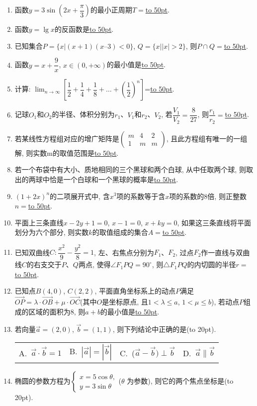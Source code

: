 \documentclass[10pt,a4paper]{article}
\newcommand{\blank}[1]{\underline{\hbox to #1pt{}}}
\newcommand{\bracket}[1]{(\hbox to #1pt{})}
\newcommand{\fourch}[4]{\par\begin{tabular}{p{.23\textwidth}p{.23\textwidth}p{.23\textwidth}p{.23\textwidth}}
A.~#1 &B.~#2& C.~#3& D.~#4
\end{tabular}}
\begin{document}
\begin{enumerate}[1.]
\item 函数$y=3\sin(2x+\dfrac{\pi}3)$的最小正周期$T=$\blank{50}.
\item 函数$y=\lg x$的反函数是\blank{50}.
\item 已知集合$P=\{x|(x+1)(x–3)<0\}$, $Q=\{x||x|>2\}$, 则$P\cap Q=$\blank{50}.
\item 函数$y=x+\dfrac 9x$, $x\in (0,+\infty)$的最小值是\blank{50}.
\item 计算: $\displaystyle\lim_{n\to \infty}[\dfrac 12+\dfrac 14+\dfrac 18+\ldots +(\dfrac 12)^n]$=\blank{50}.
\item 记球$O_1$和$O_2$的半径、体积分别为$r_1$、$V_1$和$r_2$、$V_2$, 若$\dfrac{V_1}{V_2}=\dfrac 8{27}$, 则$\dfrac{r_1}{r_2}=$\blank{50}.
\item 若某线性方程组对应的增广矩阵是$\begin{pmatrix}   m & 4 & 2  \\1 & m & m  \end{pmatrix}$, 且此方程组有唯一的一组解, 则实数m的取值范围是\blank{50}.
\item 若一个布袋中有大小、质地相同的三个黑球和两个白球, 从中任取两个球, 则取出的两球中恰是一个白球和一个黑球的概率是\blank{50}.
\item $(1+2x)^n$的二项展开式中, 含$x^3$项的系数等于含$x$项的系数的$8$倍, 则正整数$n=$\blank{50}.
\item 平面上三条直线$x-2y+1=0$, $x-1=0$, $x+ky=0$, 如果这三条直线将平面划分为六个部分, 则实数$k$的取值组成的集合$A=$\blank{50}.
\item 已知双曲线$C: \dfrac{x^2}9-\dfrac{y^2}8=1$, 左、右焦点分别为$F_1$、$F_2$, 过点$F_2$作一直线与双曲线$C$的右支交于$P$、$Q$两点, 使得$\angle F_1PQ=90^\circ$, 则$\triangle F_1PQ$的内切圆的半径$r=$\blank{50}.
\item 已知点$B(4,0)$, $C(2,2)$, 平面直角坐标系上的动点$P$满足$\overrightarrow{OP}=\lambda \cdot \overrightarrow{OB}+\mu \cdot \overrightarrow{OC}$(其中$O$是坐标原点, 且$1<\lambda \le a$, $1<\mu \le b$), 若动点$P$组成的区域的面积为$8$, 则$a+b$的最小值是\blank{50}.
\item 若向量$\overrightarrow a=(2,0)$, $\overrightarrow b=(1,1)$, 则下列结论中正确的是\bracket{20}.
\fourch{$\overrightarrow a\cdot \overrightarrow b=1$}{$|\overrightarrow a|=|\overrightarrow b|$}{($\overrightarrow a-\overrightarrow b)\perp \overrightarrow b$}{$\overrightarrow a\parallel \overrightarrow b$}
\item 椭圆的参数方程为$\begin{cases} x=5\cos \theta,  \\ y=3\sin \theta  \end{cases}$($\theta$ 为参数), 则它的两个焦点坐标是\bracket{20}.

\end{enumerate}
\end{document}
